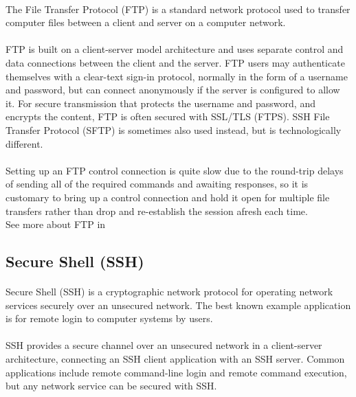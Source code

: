 \paragraph{}The File Transfer Protocol (FTP) is a standard network protocol used to transfer computer files between a client and server on a computer network.
\paragraph{}FTP is built on a client-server model architecture and uses separate control and data connections between the client and the server. FTP users may authenticate themselves with a clear-text sign-in protocol, normally in the form of a username and password, but can connect anonymously if the server is configured to allow it. For secure transmission that protects the username and password, and encrypts the content, FTP is often secured with SSL/TLS (FTPS). SSH File Transfer Protocol (SFTP) is sometimes also used instead, but is technologically different.
\paragraph{}Setting up an FTP control connection is quite slow due to the round-trip delays of sending all of the required commands and awaiting responses, so it is customary to bring up a control connection and hold it open for multiple file transfers rather than drop and re-establish the session afresh each time. \\
See more about FTP in \cite{FTP}
\subsection{Secure Shell (SSH)} 
\paragraph{}Secure Shell (SSH) is a cryptographic network protocol for operating network services securely over an unsecured network. The best known example application is for remote login to computer systems by users.
\paragraph{}SSH provides a secure channel over an unsecured network in a client-server architecture, connecting an SSH client application with an SSH server. Common applications include remote command-line login and remote command execution, but any network service can be secured with SSH. 
